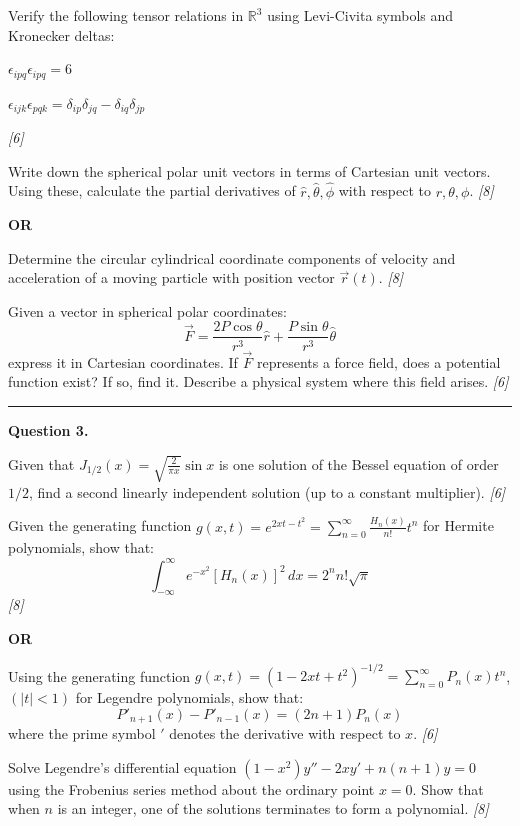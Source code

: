 \documentclass[11pt,a4paper]{article}
\newcommand{\pts}[1]{\hfill   \textit{[#1]}}
\begin{document}
\begin{parts}
  \item Verify the following tensor relations in $\mathbb{R}^3$ using Levi-Civita symbols and Kronecker deltas:
    
\begin{parts}
      \item $\epsilon_{ipq} \epsilon_{ipq} = 6$
      \item $\epsilon_{ijk} \epsilon_{pqk} = \delta_{ip} \delta_{jq} - \delta_{iq} \delta_{jp}$
    \end{parts} \pts{6}
  \item Write down the spherical polar unit vectors in terms of Cartesian unit vectors. Using these, calculate the partial derivatives of $\hat{r}, \hat{ \theta}, \hat{\phi}$ with respect to $r,  \theta, \phi$. \pts{8}
\end{parts}
\hfill   \textbf{OR}

\begin{parts}
  \item Determine the circular cylindrical coordinate components of velocity and acceleration of a moving particle with position vector $\vec{r}(t)$. \pts{8}
  \item Given a vector in spherical polar coordinates:
    \[ \vec{F} = \frac{2P \cos \theta}{r^3} \hat{r} + \frac{P \sin \theta}{r^3} \hat{ \theta} \]
    express it in Cartesian coordinates. If $\vec{F}$ represents a force field, does a potential function exist? If so, find it. Describe a physical system where this field arises. \pts{6}
\end{parts}

\medskip\rule{\linewidth}{0.2pt}




\noindent   \textbf{Question 3.}

\begin{parts}
  \item Given that $J_{1/2}(x) = \sqrt{\frac{2}{\pi x}} \sin x$ is one solution of the Bessel equation of order $1/2$, find a second linearly independent solution (up to a constant multiplier). \pts{6}
  \item Given the generating function $g(x, t) = e^{2xt - t^2} = \sum_{n=0}^{\infty} \frac{H_n(x)}{n!} t^n$ for Hermite polynomials, show that:
    \[ \int_{-\infty}^{\infty} e^{-x^2} [H_n(x)]^2 \, dx = 2^n n! \sqrt{\pi} \] \pts{8}
\end{parts}
\hfill   \textbf{OR}

\begin{parts}
  \item Using the generating function $g(x,t) = (1-2xt+t^2)^{-1/2} = \sum_{n=0}^{\infty} P_n(x)t^n$, $(|t| < 1)$ for Legendre polynomials, show that:
    \[ P'_{n+1}(x) - P'_{n-1}(x) = (2n+1)P_n(x) \]
    where the prime symbol $'$ denotes the derivative with respect to $x$. \pts{6}
  \item Solve Legendre's differential equation $(1-x^2)y'' - 2xy' + n(n+1)y = 0$ using the Frobenius series method about the ordinary point $x=0$. Show that when $n$ is an integer, one of the solutions terminates to form a polynomial. \pts{8}
\end{parts}
\end{document}
